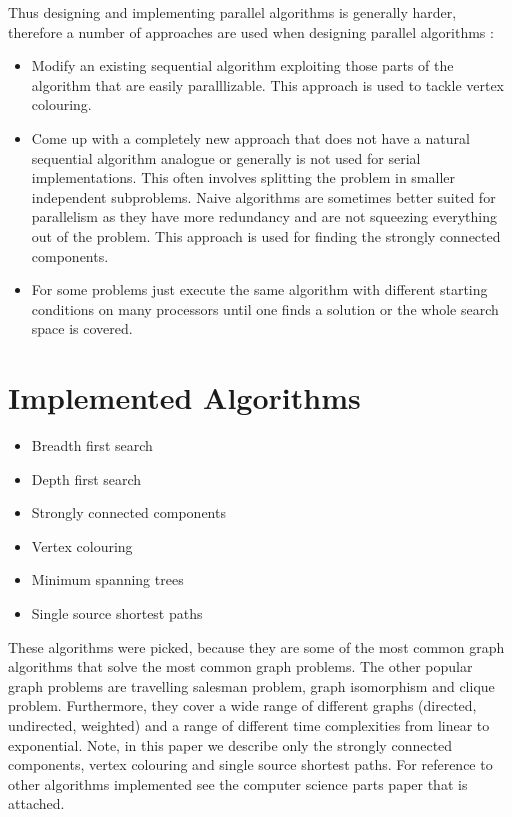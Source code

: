 \documentclass{report}
\theoremstyle{plain}
\theoremstyle{definition}
\theoremstyle{remark}
\numberwithin{definition}{chapter}
\numberwithin{example}{chapter}
\numberwithin{figure}{chapter}
\numberwithin{theorem}{chapter}
\numberwithin{lemma}{chapter}
\begin{document}
Thus designing and implementing parallel algorithms is generally harder, therefore a number of approaches are used when designing parallel algorithms \cite{berman1996fundamentals}:
\begin{itemize}
  \item Modify an existing sequential algorithm exploiting those parts of the algorithm that are easily paralllizable. This approach is used to tackle vertex colouring.
  \item Come up with a completely new approach that does not have a natural sequential algorithm analogue or generally is not used for serial implementations. This often involves splitting the problem in smaller independent subproblems. Naive algorithms are sometimes better suited for parallelism as they have more redundancy and are not squeezing everything out of the problem. This approach is used for finding the strongly connected components.
  \item For some problems just execute the same algorithm with different starting conditions on many processors until one finds a solution or the whole search space is covered.
\end{itemize}

\section{Implemented Algorithms}
\begin{itemize}
  \item Breadth first search
  \item Depth first search
  \item Strongly connected components
  \item Vertex colouring
  \item Minimum spanning trees
  \item Single source shortest paths
\end{itemize}

These algorithms were picked, because they are some of the most common graph algorithms that solve the most common graph problems. The other popular graph problems are travelling salesman problem, graph isomorphism and clique problem. Furthermore, they cover a wide range of different graphs (directed, undirected, weighted) and a range of different time complexities from linear to exponential. Note, in this paper we describe only the strongly connected components, vertex colouring and single source shortest paths. For reference to other algorithms implemented see the computer science parts paper that is attached.
\end{document}
